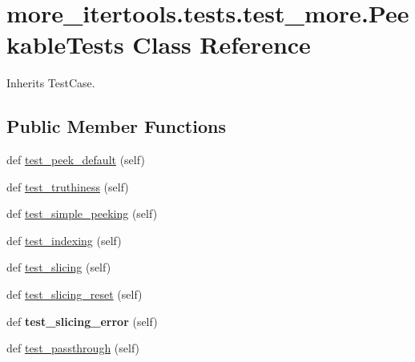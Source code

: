 \hypertarget{classmore__itertools_1_1tests_1_1test__more_1_1_peekable_tests}{}\section{more\+\_\+itertools.\+tests.\+test\+\_\+more.\+Peekable\+Tests Class Reference}
\label{classmore__itertools_1_1tests_1_1test__more_1_1_peekable_tests}


Inherits Test\+Case.

\subsection*{Public Member Functions}
\begin{DoxyCompactItemize}
\item 
def \hyperlink{classmore__itertools_1_1tests_1_1test__more_1_1_peekable_tests_af30eaa985fd439e221ebd44fe2780cf1}{test\+\_\+peek\+\_\+default} (self)
\item 
def \hyperlink{classmore__itertools_1_1tests_1_1test__more_1_1_peekable_tests_a2409487b1fa8b1068c91a02505d68838}{test\+\_\+truthiness} (self)
\item 
def \hyperlink{classmore__itertools_1_1tests_1_1test__more_1_1_peekable_tests_a86afded9739a9f3fb003ff22cbe8f243}{test\+\_\+simple\+\_\+peeking} (self)
\item 
def \hyperlink{classmore__itertools_1_1tests_1_1test__more_1_1_peekable_tests_a151bbc79c3e9e407f17c23ff3bed0978}{test\+\_\+indexing} (self)
\item 
def \hyperlink{classmore__itertools_1_1tests_1_1test__more_1_1_peekable_tests_a82602b75a1d0935a2ca570c11c257aad}{test\+\_\+slicing} (self)
\item 
def \hyperlink{classmore__itertools_1_1tests_1_1test__more_1_1_peekable_tests_a151a68e1de3426f956dda3f9cb05de1f}{test\+\_\+slicing\+\_\+reset} (self)
\item 
\mbox{\label{classmore__itertools_1_1tests_1_1test__more_1_1_peekable_tests_a0072ce05eb5a9104c6d4ae1be332f4e6}} 
def {\bfseries test\+\_\+slicing\+\_\+error} (self)
\item 
def \hyperlink{classmore__itertools_1_1tests_1_1test__more_1_1_peekable_tests_a3e50b7262d4b77e592c471d1083df5aa}{test\+\_\+passthrough} (self)
\item 

\end{DoxyCompactItemize}
